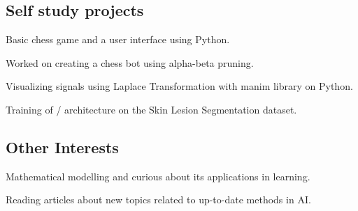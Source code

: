 \documentclass[letter, 14pt]{article}
\begin{document}
\subsection{Self study projects}
\subtext{}
\begin{zitemize}
\item Basic chess game and a user interface using Python. \href{https://github.com/denizberkin/test_chess}{\color{black}\externallink}
\item Worked on creating a chess bot using alpha-beta pruning.
\item Visualizing signals using Laplace Transformation with manim library on Python.
\item Training of \href{https://arxiv.org/pdf/1505.04597}{\color{black}{UNet}}/\href{https://arxiv.org/pdf/2201.01266}{\color{black}{SwinUnetR}} architecture on the Skin Lesion Segmentation dataset.

\end{zitemize}

\subsection{Other Interests}
\begin{zitemize}
\item Mathematical modelling and curious about its applications in learning.
\item Reading articles about new topics related to up-to-date methods in AI.
\end{zitemize}
\end{document}
